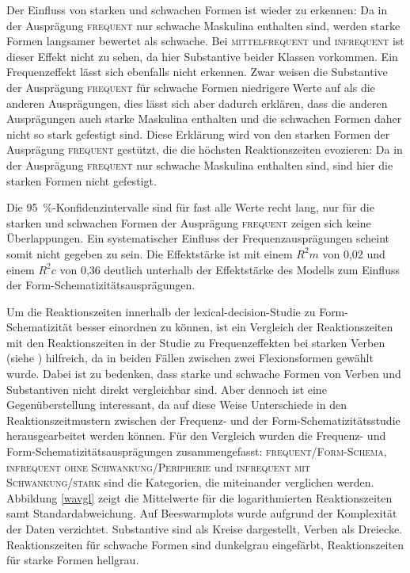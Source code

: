 Der Einfluss von starken und schwachen Formen ist wieder zu erkennen: Da in der Ausprägung \textsc{frequent} nur schwache Maskulina enthalten sind, werden starke Formen langsamer bewertet als schwache. Bei \textsc{mittelfrequent} und \textsc{infrequent} ist dieser Effekt nicht zu sehen, da hier Substantive beider Klassen vorkommen. Ein Frequenzeffekt lässt sich ebenfalls nicht erkennen. Zwar weisen die Substantive der Ausprägung \textsc{frequent} für schwache Formen niedrigere Werte auf als die anderen Ausprägungen, dies lässt sich aber dadurch erklären, dass die anderen Ausprägungen auch starke Maskulina enthalten und die schwachen Formen daher nicht so stark gefestigt sind. Diese Erklärung wird von den starken Formen der Ausprägung \textsc{frequent} gestützt, die die höchsten Reaktionszeiten evozieren: Da in der Ausprägung \textsc{frequent} nur schwache Maskulina enthalten sind, sind hier die starken Formen nicht gefestigt. 


Die 95~\%-Konfidenzintervalle sind für fast alle Werte recht lang, nur für die starken und schwachen Formen der Ausprägung \textsc{frequent} zeigen sich keine Überlappungen. Ein systematischer Einfluss der Frequenzausprägungen scheint somit nicht gegeben zu sein. Die Effektstärke ist mit einem $R^2m$ von 0,02 und einem $R^2c$ von 0,36 deutlich unterhalb der Effektstärke des Modells zum Einfluss der Form-Schematizitätsausprägungen.

Um die Reaktionszeiten innerhalb der lexical-decision-Studie zu Form-Sche\-ma\-ti\-zi\-tät besser einordnen zu können, ist ein Vergleich der Reaktionszeiten mit den Reaktionszeiten in der Studie zu Frequenzeffekten bei starken Verben (siehe ) hilfreich, da in beiden Fällen zwischen zwei Fle\-xionsformen gewählt wurde. Dabei ist zu bedenken, dass starke und schwache Formen von Verben und Substantiven nicht direkt vergleichbar sind. Aber dennoch ist eine Gegenüberstellung interessant, da auf diese Weise Unterschiede in den Reaktionszeitmustern zwischen der Frequenz- und der Form-Schematizitätsstudie herausgearbeitet werden können. Für den Vergleich wurden die Frequenz- und Form-Schematizitätsausprägungen zusammengefasst: \textsc{frequent/Form-Schema}, \textsc{infrequent ohne Schwankung/Pe\-ri\-phe\-rie} und \textsc{infrequent mit Schwankung/stark} sind die Kategorien, die miteinander verglichen werden. Abbildung \ref{wavgl} zeigt die Mittelwerte für die logarithmierten Reaktionszeiten samt Standardabweichung. Auf Beeswarmplots wurde aufgrund der Komplexität der Daten verzichtet. Substantive sind als Kreise dargestellt, Verben als Dreiecke. Reaktionszeiten für schwache Formen sind dunkelgrau eingefärbt, Reaktionszeiten für starke Formen hellgrau.

